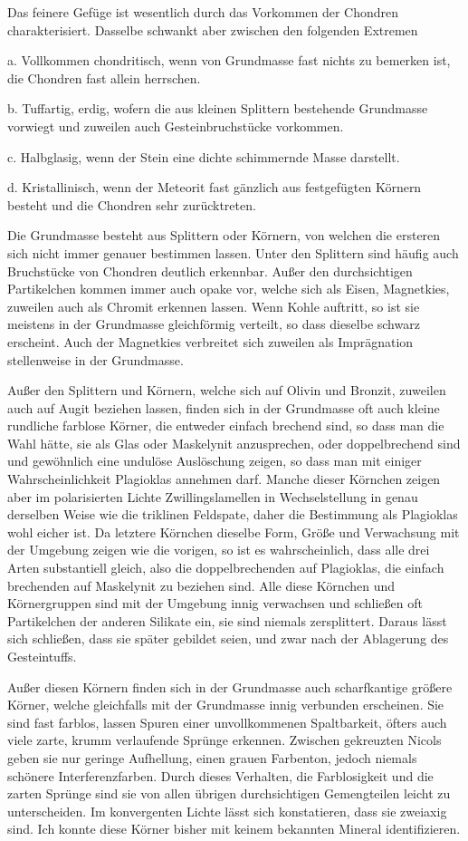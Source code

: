 \documentclass[a4paper, 12pt, oneside]{article}
\begin{document}
Das feinere Gefüge ist wesentlich durch das Vorkommen der Chondren charakterisiert. Dasselbe schwankt aber zwischen den folgenden Extremen

a. Vollkommen chondritisch, wenn von Grundmasse fast nichts zu bemerken ist, die Chondren fast allein herrschen.

b. Tuffartig, erdig, wofern die aus kleinen Splittern bestehende Grundmasse vorwiegt und zuweilen auch Gesteinbruchstücke vorkommen.

c. Halbglasig, wenn der Stein eine dichte schimmernde Masse darstellt.

d. Kristallinisch, wenn der Meteorit fast gänzlich aus festgefügten Körnern besteht und die Chondren sehr zurücktreten.

Die Grundmasse besteht aus Splittern oder Körnern, von welchen die ersteren sich nicht immer genauer bestimmen lassen. Unter den Splittern sind häufig auch Bruchstücke von Chondren deutlich erkennbar. Außer den durchsichtigen Partikelchen kommen immer auch opake vor, welche sich als Eisen, Magnetkies, zuweilen auch als Chromit erkennen lassen. Wenn Kohle auftritt, so ist sie meistens in der Grundmasse gleichförmig verteilt, so dass dieselbe schwarz erscheint. Auch der Magnetkies verbreitet sich zuweilen als Imprägnation stellenweise in der Grundmasse.

Außer den Splittern und Körnern, welche sich auf Olivin und Bronzit, zuweilen auch auf Augit beziehen lassen, finden sich in der Grundmasse oft auch kleine rundliche farblose Körner, die entweder einfach brechend sind, so dass man die Wahl hätte, sie als Glas oder Maskelynit anzusprechen, oder doppelbrechend sind und gewöhnlich eine undulöse Auslöschung zeigen, so dass man mit einiger Wahrscheinlichkeit Plagioklas annehmen darf. Manche dieser Körnchen zeigen aber im polarisierten Lichte Zwillingslamellen in Wechselstellung in genau derselben Weise wie die triklinen Feldspate, daher die Bestimmung als Plagioklas wohl eicher ist. Da letztere Körnchen dieselbe Form, Größe und Verwachsung mit der Umgebung zeigen wie die vorigen, so ist es wahrscheinlich, dass alle drei Arten substantiell gleich, also die doppelbrechenden auf Plagioklas, die einfach brechenden auf Maskelynit zu beziehen sind. Alle diese Körnchen und Körnergruppen sind mit der Umgebung innig verwachsen und schließen oft Partikelchen der anderen Silikate ein, sie sind niemals zersplittert. Daraus lässt sich schließen, dass sie später gebildet seien, und zwar nach der Ablagerung des Gesteintuffs.

Außer diesen Körnern finden sich in der Grundmasse auch scharfkantige größere Körner, welche gleichfalls mit der Grundmasse innig verbunden erscheinen. Sie sind fast farblos, lassen Spuren einer unvollkommenen Spaltbarkeit, öfters auch viele zarte, krumm verlaufende Sprünge erkennen. Zwischen gekreuzten Nicols geben sie nur geringe Aufhellung, einen grauen Farbenton, jedoch niemals schönere Interferenzfarben. Durch dieses Verhalten, die Farblosigkeit und die zarten Sprünge sind sie von allen übrigen durchsichtigen Gemengteilen leicht zu unterscheiden. Im konvergenten Lichte lässt sich konstatieren, dass sie zweiaxig sind. Ich konnte diese Körner bisher mit keinem bekannten Mineral identifizieren.
\end{document}

